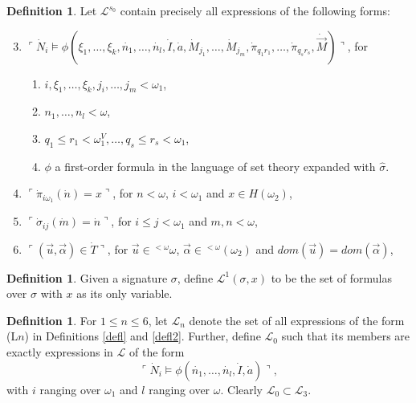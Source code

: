 \documentclass[12pt, twoside]{memoir}
\numberwithin{equation}{section}
\theoremstyle{definition}
\newtheorem{defi}[thm]{Definition}
\theoremstyle{remark}
\theoremstyle{definition}
\theoremstyle{definition}
\theoremstyle{definition}
\theoremstyle{remark}
\begin{document}
\begin{defi}\label{def433}
Let $\mathcal{L}^{s_0}$ contain precisely all expressions of the following forms:
\begin{enumerate}[label=(L\arabic*), leftmargin=40pt]
    \setcounter{enumi}{2}
    \item\label{l3} $\ulcorner \dot{N}_i \models \phi(\xi_1, \ldots, \xi_k, \dot{n_1}, \ldots, \dot{n_l}, \dot{I}, \dot{a}, \dot{M}_{j_1}, \ldots, \dot{M}_{j_m}, \dot{\pi}_{q_{1}r_{1}}, \ldots, \dot{\pi}_{q_{s}r_{s}}, \dot{\Vec{M}}) \urcorner$, for 
    \begin{enumerate}[label=(\alph*), leftmargin=15pt]
        \item $i, \xi_1, \ldots, \xi_k, j_i, \ldots, j_m < \omega_1$,
        \item $n_1, \ldots, n_l < \omega$, 
        \item $q_1 \leq r_1 < \omega_1^V, \ldots, q_s \leq r_s < \omega_1$,
        \item $\phi$ a first-order formula in the language of set theory expanded with $\hat{\sigma}$.
    \end{enumerate}
    \item\label{l4} $\ulcorner \dot{\pi}_{i\omega_1}(\dot{n}) = x \urcorner$, for $n < \omega$, $i < \omega_1$ and $x \in H(\omega_2)$,
    \item\label{l6} $\ulcorner \dot{\sigma}_{ij}(\dot{m}) = \dot{n} \urcorner$, for $i \leq j < \omega_1$ and $m, n < \omega$, 
    \item\label{l7} $\ulcorner (\Vec{u}, \Vec{\alpha}) \in \dot{T} \urcorner$, for $\Vec{u} \in {^{<\omega}{\omega}}$, $\Vec{\alpha} \in {^{<\omega}{(\omega_2)}}$ and $dom(\Vec{u}) = dom(\Vec{\alpha})$,
\end{enumerate}
\end{defi}

\begin{defi}\label{defsvf}
Given a signature $\sigma$, define $\mathcal{L}^1(\sigma, x)$ to be the set of formulas over $\sigma$ with $x$ as its only variable.
\end{defi}

\begin{defi}\label{subn}
For $1 \leq n \leq 6$, let $\mathcal{L}_n$ denote the set of all expressions of the form (L$n$) in Definitions \ref{defl} and \ref{defl2}. Further, define $\mathcal{L}_0$ such that its members are exactly expressions in $\mathcal{L}$ of the form 
\begin{equation*}
    \ulcorner \dot{N}_i \models \phi(\dot{n_1}, \ldots, \dot{n_l}, \dot{I}, \dot{a}) \urcorner,
\end{equation*}
with $i$ ranging over $\omega_1$ and $l$ ranging over $\omega$. Clearly $\mathcal{L}_0 \subset \mathcal{L}_3$.
\end{defi}
\end{document}
